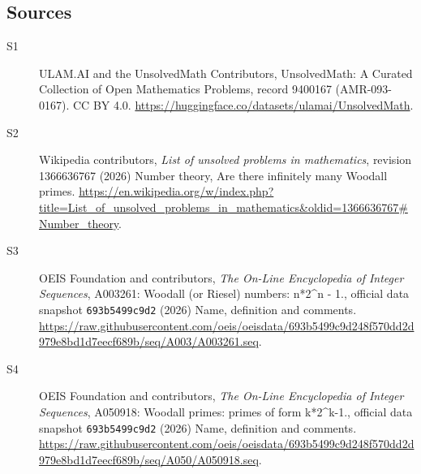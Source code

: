 \documentclass[11pt]{article}
\begin{document}
\subsection{Sources}
\begin{description}
\item[\hypertarget{source:9400167:1}{S1}] ULAM.AI and the UnsolvedMath Contributors, UnsolvedMath: A Curated Collection of Open Mathematics Problems, record 9400167 (AMR-093-0167). CC BY 4.0. \url{https://huggingface.co/datasets/ulamai/UnsolvedMath}.
\item[\hypertarget{source:9400167:2}{S2}] Wikipedia contributors, \emph{List of unsolved problems in mathematics}, revision 1366636767 (2026) Number theory, Are there infinitely many Woodall primes. \url{https://en.wikipedia.org/w/index.php?title=List_of_unsolved_problems_in_mathematics&oldid=1366636767#Number_theory}.
\item[\hypertarget{source:9400167:3}{S3}] OEIS Foundation and contributors, \emph{The On-Line Encyclopedia of Integer Sequences}, A003261: Woodall (or Riesel) numbers: n*2\textasciicircum{}n - 1., official data snapshot \texttt{693b5499c9d2} (2026) Name, definition and comments. \url{https://raw.githubusercontent.com/oeis/oeisdata/693b5499c9d248f570dd2d979e8bd1d7eecf689b/seq/A003/A003261.seq}.
\item[\hypertarget{source:9400167:4}{S4}] OEIS Foundation and contributors, \emph{The On-Line Encyclopedia of Integer Sequences}, A050918: Woodall primes: primes of form k*2\textasciicircum{}k-1., official data snapshot \texttt{693b5499c9d2} (2026) Name, definition and comments. \url{https://raw.githubusercontent.com/oeis/oeisdata/693b5499c9d248f570dd2d979e8bd1d7eecf689b/seq/A050/A050918.seq}.
\end{description}
\label{end:9400167}
\end{document}
